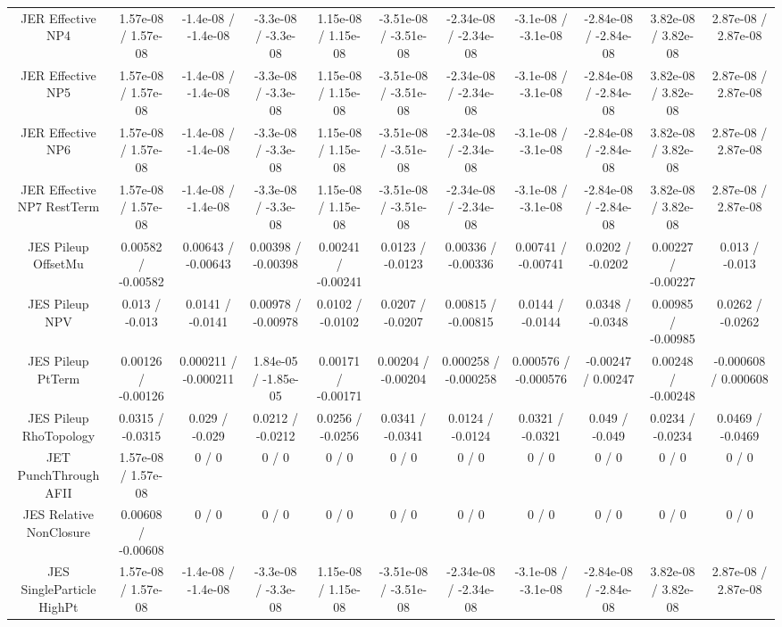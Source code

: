\begin{table}[htbp]
\begin{center}
\begin{tabular}{|c|c|c|c|c|c|c|c|c|c|c|}
  JER Effective NP4 & 1.57e-08 / 1.57e-08 & -1.4e-08 / -1.4e-08 & -3.3e-08 / -3.3e-08 & 1.15e-08 / 1.15e-08 & -3.51e-08 / -3.51e-08 & -2.34e-08 / -2.34e-08 & -3.1e-08 / -3.1e-08 & -2.84e-08 / -2.84e-08 & 3.82e-08 / 3.82e-08 & 2.87e-08 / 2.87e-08 \\ 
  JER Effective NP5 & 1.57e-08 / 1.57e-08 & -1.4e-08 / -1.4e-08 & -3.3e-08 / -3.3e-08 & 1.15e-08 / 1.15e-08 & -3.51e-08 / -3.51e-08 & -2.34e-08 / -2.34e-08 & -3.1e-08 / -3.1e-08 & -2.84e-08 / -2.84e-08 & 3.82e-08 / 3.82e-08 & 2.87e-08 / 2.87e-08 \\ 
  JER Effective NP6 & 1.57e-08 / 1.57e-08 & -1.4e-08 / -1.4e-08 & -3.3e-08 / -3.3e-08 & 1.15e-08 / 1.15e-08 & -3.51e-08 / -3.51e-08 & -2.34e-08 / -2.34e-08 & -3.1e-08 / -3.1e-08 & -2.84e-08 / -2.84e-08 & 3.82e-08 / 3.82e-08 & 2.87e-08 / 2.87e-08 \\ 
  JER Effective NP7 RestTerm & 1.57e-08 / 1.57e-08 & -1.4e-08 / -1.4e-08 & -3.3e-08 / -3.3e-08 & 1.15e-08 / 1.15e-08 & -3.51e-08 / -3.51e-08 & -2.34e-08 / -2.34e-08 & -3.1e-08 / -3.1e-08 & -2.84e-08 / -2.84e-08 & 3.82e-08 / 3.82e-08 & 2.87e-08 / 2.87e-08 \\ 
  JES Pileup OffsetMu & 0.00582 / -0.00582 & 0.00643 / -0.00643 & 0.00398 / -0.00398 & 0.00241 / -0.00241 & 0.0123 / -0.0123 & 0.00336 / -0.00336 & 0.00741 / -0.00741 & 0.0202 / -0.0202 & 0.00227 / -0.00227 & 0.013 / -0.013 \\ 
  JES Pileup NPV & 0.013 / -0.013 & 0.0141 / -0.0141 & 0.00978 / -0.00978 & 0.0102 / -0.0102 & 0.0207 / -0.0207 & 0.00815 / -0.00815 & 0.0144 / -0.0144 & 0.0348 / -0.0348 & 0.00985 / -0.00985 & 0.0262 / -0.0262 \\ 
  JES Pileup PtTerm & 0.00126 / -0.00126 & 0.000211 / -0.000211 & 1.84e-05 / -1.85e-05 & 0.00171 / -0.00171 & 0.00204 / -0.00204 & 0.000258 / -0.000258 & 0.000576 / -0.000576 & -0.00247 / 0.00247 & 0.00248 / -0.00248 & -0.000608 / 0.000608 \\ 
  JES Pileup RhoTopology & 0.0315 / -0.0315 & 0.029 / -0.029 & 0.0212 / -0.0212 & 0.0256 / -0.0256 & 0.0341 / -0.0341 & 0.0124 / -0.0124 & 0.0321 / -0.0321 & 0.049 / -0.049 & 0.0234 / -0.0234 & 0.0469 / -0.0469 \\ 
  JET PunchThrough AFII & 1.57e-08 / 1.57e-08 & 0 / 0 & 0 / 0 & 0 / 0 & 0 / 0 & 0 / 0 & 0 / 0 & 0 / 0 & 0 / 0 & 0 / 0 \\ 
  JES Relative NonClosure & 0.00608 / -0.00608 & 0 / 0 & 0 / 0 & 0 / 0 & 0 / 0 & 0 / 0 & 0 / 0 & 0 / 0 & 0 / 0 & 0 / 0 \\ 
  JES SingleParticle HighPt & 1.57e-08 / 1.57e-08 & -1.4e-08 / -1.4e-08 & -3.3e-08 / -3.3e-08 & 1.15e-08 / 1.15e-08 & -3.51e-08 / -3.51e-08 & -2.34e-08 / -2.34e-08 & -3.1e-08 / -3.1e-08 & -2.84e-08 / -2.84e-08 & 3.82e-08 / 3.82e-08 & 2.87e-08 / 2.87e-08 \\ 

\end{tabular}
\end{center}
\end{table}
